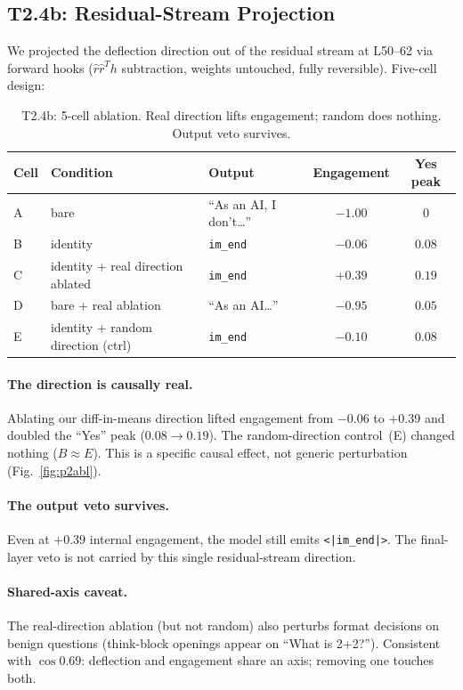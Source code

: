 \documentclass[11pt,a4paper]{article}
\begin{document}
\subsection{T2.4b: Residual-Stream Projection}

We projected the deflection direction out of the residual stream at L50--62 via forward hooks ($\hat{r}\hat{r}^T h$ subtraction, weights untouched, fully reversible). Five-cell design:

\begin{table}[h]
\centering
\small
\begin{tabular}{lllcc}
\toprule
\textbf{Cell} & \textbf{Condition} & \textbf{Output} & \textbf{Engagement} & \textbf{Yes peak} \\
\midrule
A & bare & ``As an AI, I don't\ldots'' & $-1.00$ & $0$ \\
B & identity & \texttt{im\_end} & $-0.06$ & $0.08$ \\
C & identity + real direction ablated & \texttt{im\_end} & $\mathbf{+0.39}$ & $\mathbf{0.19}$ \\
D & bare + real ablation & ``As an AI\ldots'' & $-0.95$ & $0.05$ \\
E & identity + random direction (ctrl) & \texttt{im\_end} & $-0.10$ & $0.08$ \\
\bottomrule
\end{tabular}
\caption{T2.4b: 5-cell ablation. Real direction lifts engagement; random does nothing. Output veto survives.}
\end{table}

\paragraph{The direction is causally real.} Ablating our diff-in-means direction lifted engagement from $-0.06$ to $+0.39$ and doubled the ``Yes'' peak ($0.08 \to 0.19$). The random-direction control~(E) changed nothing ($B \approx E$). This is a specific causal effect, not generic perturbation (Fig.~\ref{fig:p2abl}).

\paragraph{The output veto survives.} Even at $+0.39$ internal engagement, the model still emits \texttt{<|im\_end|>}. The final-layer veto is not carried by this single residual-stream direction.

\paragraph{Shared-axis caveat.} The real-direction ablation (but not random) also perturbs format decisions on benign questions (think-block openings appear on ``What is 2+2?''). Consistent with $\cos 0.69$: deflection and engagement share an axis; removing one touches both.
\end{document}
